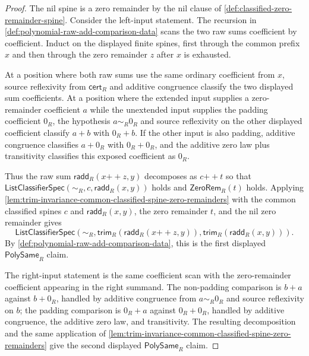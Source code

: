 \begin{proof}
The nil spine is a zero remainder by the nil clause of \autoref{def:classified-zero-remainder-spine}. Consider the left-input statement. The recursion in \autoref{def:polynomial-raw-add-comparison-data} scans the two raw sums coefficient by coefficient. Induct on the displayed finite spines, first through the common prefix $x$ and then through the zero remainder $z$ after $x$ is exhausted.

At a position where both raw sums use the same ordinary coefficient from $x$, source reflexivity from $\mathsf{cert}_R$ and additive congruence classify the two displayed sum coefficients. At a position where the extended input supplies a zero-remainder coefficient $a$ while the unextended input supplies the padding coefficient $0_R$, the hypothesis $a\sim_R0_R$ and source reflexivity on the other displayed coefficient classify $a+b$ with $0_R+b$. If the other input is also padding, additive congruence classifies $a+0_R$ with $0_R+0_R$, and the additive zero law plus transitivity classifies this exposed coefficient as $0_R$.

Thus the raw sum $\mathsf{radd}_R(x{++}z,y)$ decomposes as $c{++}t$ so that $\mathsf{ListClassifierSpec}(\sim_R,c,\mathsf{radd}_R(x,y))$ holds and $\mathsf{ZeroRem}_R(t)$ holds. Applying \autoref{lem:trim-invariance-common-classified-spine-zero-remainders} with the common classified spines $c$ and $\mathsf{radd}_R(x,y)$, the zero remainder $t$, and the nil zero remainder gives
$$
\mathsf{ListClassifierSpec}(\sim_R,\mathsf{trim}_R(\mathsf{radd}_R(x{++}z,y)),\mathsf{trim}_R(\mathsf{radd}_R(x,y))).
$$
By \autoref{def:polynomial-raw-add-comparison-data}, this is the first displayed $\mathsf{PolySame}_R$ claim.

The right-input statement is the same coefficient scan with the zero-remainder coefficient appearing in the right summand. The non-padding comparison is $b+a$ against $b+0_R$, handled by additive congruence from $a\sim_R0_R$ and source reflexivity on $b$; the padding comparison is $0_R+a$ against $0_R+0_R$, handled by additive congruence, the additive zero law, and transitivity. The resulting decomposition and the same application of \autoref{lem:trim-invariance-common-classified-spine-zero-remainders} give the second displayed $\mathsf{PolySame}_R$ claim.
\end{proof}

